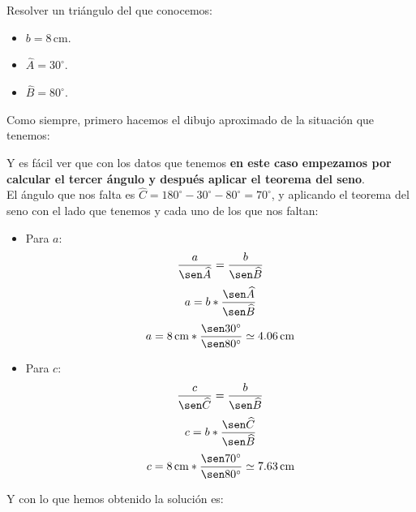 \documentclass[a4paper,11pt,answers]{exam}
\newcommand{\degree}{^\circ}
\newcommand\unidad[1]{\,\text{#1}}
\begin{document}
Resolver un triángulo del que conocemos:
\begin{itemize}
\item $b=8\unidad{cm}$.
\item $\widehat{A} = 30\degree$.
\item $\widehat{B} = 80\degree$.
\end{itemize}

\begin{solution}
  Como siempre, primero hacemos el dibujo aproximado de la situación que tenemos:
  \begin{center}
  \end{center}
  Y es fácil ver que con los datos que tenemos \textbf{en este caso empezamos por calcular el tercer
    ángulo y después aplicar el teorema del seno}.\\
  El ángulo que nos falta es $\widehat{C} = 180\degree - 30\degree-80\degree = 70\degree$, y aplicando
  el teorema del seno con el lado que tenemos y cada uno de los que nos faltan:
  \begin{itemize}
  \item Para $a$:
    \[\frac{a}{\sen \widehat{A}} = \frac{b}{\sen \widehat{B}}\]
    \[a = b*\frac{\sen \widehat{A}}{\sen \widehat{B}}\]
    \[a = 8\unidad{cm}*\frac{\sen 30\degree}{\sen 80\degree} \simeq 4.06\unidad{cm}\]
  \item Para $c$:
    \[\frac{c}{\sen \widehat{C}} = \frac{b}{\sen \widehat{B}}\]
    \[c = b*\frac{\sen \widehat{C}}{\sen \widehat{B}}\]
    \[c = 8\unidad{cm}*\frac{\sen 70\degree}{\sen 80\degree} \simeq 7.63\unidad{cm}\]
  \end{itemize}
  Y con lo que hemos obtenido la solución es:
  \begin{center}
\end{center}
\end{solution}
\end{document}
